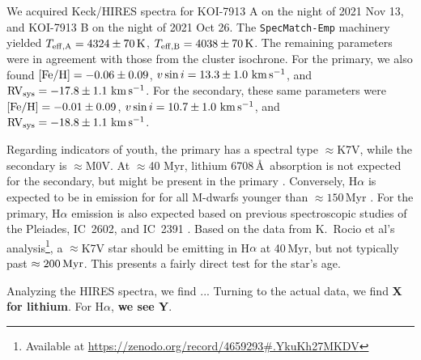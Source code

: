 \documentclass[12pt,twocolumn,linenumbers]{aastex63}
\newcommand{\mkms}{{\rm \,km\,s^{-1}}}  %
\begin{document}
We acquired Keck/HIRES spectra for KOI-7913 A on the night of 2021 Nov
13, and KOI-7913 B on the night of 2021 Oct 26.  The 
\texttt{SpecMatch-Emp} \citep{yee_SM_2017} machinery yielded $T_{\rm
eff,A} = 4324 \pm 70\,{\rm K}$, $T_{\rm eff,B} = 4038 \pm 70\,{\rm
K}$.  The remaining parameters were in agreement with those from the
cluster isochrone.  For the primary, we also found $[{\rm Fe/H}]=
-0.06 \pm 0.09$, $v\sin i = 13.3 \pm 1.0\,\mkms$, and ${\rm RV}_{\rm
sys} = -17.8 \pm 1.1\,\mkms$.  For the secondary, these same parameters
were $[{\rm Fe/H}]= -0.01 \pm 0.09$, $v\sin i = 10.7 \pm 1.0\,\mkms$,
and ${\rm RV}_{\rm sys} = -18.8 \pm 1.1\,\mkms$.


Regarding indicators of youth, the primary has a spectral type
$\approx$K7V, while the secondary is $\approx$M0V.  At $\approx$40
Myr, lithium 6708\,\AA\ absorption is not expected for the secondary,
but might be present in the primary \citep[{\it
e.g.},][Figure~8]{soderblom_ages_2014}.  Conversely, H$\alpha$ is
expected to be in emission for for all M-dwarfs younger than
$\approx150$\,Myr \citep[{\it e.g.},][]{kiman_calibration_2021}.  For
the primary, H$\alpha$ emission is also expected based on
previous spectroscopic studies of the Pleiades, IC~2602, and IC~2391
\citep[{\it e.g.},][their Figure~8]{stauffer_rotational_1997}.  Based
on the data from K.~Rocio et al's analysis\footnote{Available at
\url{https://zenodo.org/record/4659293\#.YkuKh27MKDV}}, a $\approx$K7V
star should be emitting in H$\alpha$ at 40\,Myr, but not typically
past $\approx200\,{\rm Myr}$.  This presents a fairly direct test for
the star's age.

Analyzing the HIRES spectra, we find
...
Turning to the actual data, we find {\bf X for lithium}.
For H$\alpha$, {\bf we see Y}.

% 
% 
\end{document}
